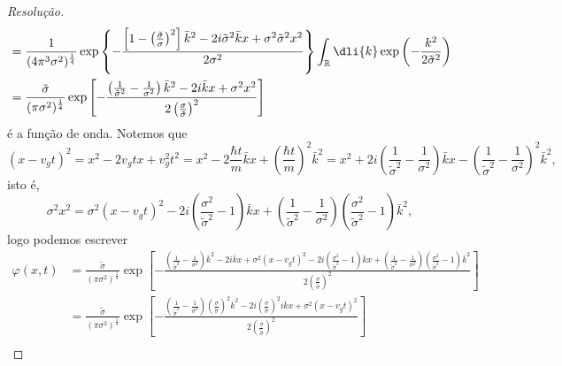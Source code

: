 \begin{proof}[Resolução]
\begin{align*}
                     &= \frac{1}{(4\pi^3 \sigma^2)^{\frac14}}\exp\left\{-\frac{\left[1 - \left(\frac{\tilde{\sigma}}{\sigma}\right)^2\right]\bar{k}^2 - 2i \tilde{\sigma}^2\bar{k}x + \sigma^2 \tilde{\sigma}^2 x^2}{2 \sigma^2}\right\}\int_{\mathbb{R}} \dli{k}\exp\left(-\frac{k^2}{2 \tilde{\sigma}^2}\right)\\
                     &= \frac{\tilde{\sigma}}{(\pi \sigma^2)^{\frac14}} \exp\left[-\frac{\left(\frac{1}{\tilde{\sigma}^2} - \frac{1}{\sigma^2}\right)\bar{k}^2 - 2i \bar{k} x + \sigma^2 x^2}{2\left(\frac{\sigma}{\tilde{\sigma}}\right)^2}\right]
    \end{align*}
    é a função de onda. Notemos que
    \begin{equation*}
        (x - v_g t)^2 = x^2 - 2v_gt x + v_g^2 t^2 = x^2 - 2\frac{\hbar t}{m}\bar{k}x + \left(\frac{\hbar t}{m}\right)^2 \bar{k}^2 = x^2 + 2i \left(\frac{1}{\tilde{\sigma}^2} - \frac{1}{\sigma^2}\right) \bar{k} x - \left(\frac{1}{\tilde{\sigma}^2} - \frac{1}{\sigma^2}\right)^2 \bar{k}^2,
    \end{equation*}
    isto é,
    \begin{equation*}
        \sigma^2 x^2 = \sigma^2 (x - v_g t)^2 - 2i \left(\frac{\sigma^2}{\tilde{\sigma}^2} - 1\right) \bar{k} x + \left(\frac{1}{\tilde{\sigma}^2} - \frac{1}{\sigma^2}\right)\left(\frac{\sigma^2}{\tilde{\sigma}^2} - 1\right) \bar{k}^2,
    \end{equation*}
    logo podemos escrever
    \begin{align*}
        \varphi(x,t) &= \frac{\tilde{\sigma}}{(\pi \sigma^2)^{\frac14}} \exp\left[-\frac{\left(\frac{1}{\tilde{\sigma}^2} - \frac{1}{\sigma^2}\right)\bar{k}^2 - 2i \bar{k} x +\sigma^2 (x - v_g t)^2 - 2i \left(\frac{\sigma^2}{\tilde{\sigma}^2} - 1\right) \bar{k} x + \left(\frac{1}{\tilde{\sigma}^2} - \frac{1}{\sigma^2}\right)\left(\frac{\sigma^2}{\tilde{\sigma}^2} - 1\right) \bar{k}^2}{2\left(\frac{\sigma}{\tilde{\sigma}}\right)^2}\right]\\
                     &= \frac{\tilde{\sigma}}{(\pi \sigma^2)^{\frac14}}\exp\left[-\frac{\left(\frac1{\tilde{\sigma}^2} - \frac{1}{\sigma^2}\right)\left(\frac{\sigma}{\tilde{\sigma}}\right)^2 \bar{k}^2 - 2i\left(\frac{\sigma}{\tilde{\sigma}}\right)^2i\bar{k}x + \sigma^2 ( x - v_g t)^2}{2 \left(\frac{\sigma}{\tilde{\sigma}}\right)^2}\right]\\

\end{align*}
\end{proof}
